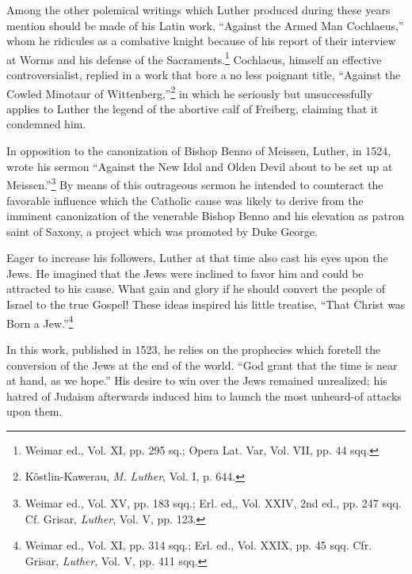 Among the other polemical writings which Luther produced during these
years mention should be made of his Latin work, “Against
the Armed Man Cochlaeus,” whom he ridicules as a combative
knight because of his report of their interview at Worms and his
defense of the Sacraments.\footnote{Weimar ed., Vol. XI, pp. 295 sq.; Opera Lat. Var, Vol. VII, pp. 44 sqq.}
Cochlaeus, himself an effective controversialist,
replied in a work that bore a no less poignant title,
“Against the Cowled Minotaur of Wittenberg,”\footnote
{Köstlin-Kawerau, \textit{M. Luther}, Vol. I, p. 644.}
in which he
seriously but unsuccessfully applies to Luther the legend of the abortive
calf of Freiberg, claiming that it condemned him.

In opposition to the canonization of Bishop Benno of Meissen,
Luther, in 1524, wrote his sermon “Against the New Idol and Olden
Devil about to be set up at Meissen.”\footnote
{Weimar ed., Vol. XV, pp. 183 sqq.; Erl. ed,, Vol. XXIV, 2nd ed., pp. 247 sqq. Cf.
Grisar, \textit{Luther}, Vol. V, pp. 123.}
By means of this outrageous
sermon he intended to counteract the favorable influence which the
Catholic cause was likely to derive from the imminent canonization
of the venerable Bishop Benno and his elevation as patron saint of
Saxony, a project which was promoted by Duke George.

Eager to increase his followers, Luther at that time also cast his
eyes upon the Jews. He imagined that the Jews were inclined to
favor him and could be attracted to his cause. What gain and glory if
he should convert the people of Israel to the true Gospel! These ideas
inspired his little treatise, “That Christ was Born a Jew.”\footnote
{Weimar ed., Vol. XI, pp. 314 sqq.; Erl. ed., Vol. XXIX, pp. 45 sqq. Cfr. Grisar,
\textit{Luther}, Vol. V, pp. 411 sqq.}


In this
work, published in 1523, he relies on the prophecies which foretell the
conversion of the Jews at the end of the world. “God grant that the
time is near at hand, as we hope.” His desire to win over the Jews
remained unrealized; his hatred of Judaism afterwards induced him
to launch the most unheard-of attacks upon them.

